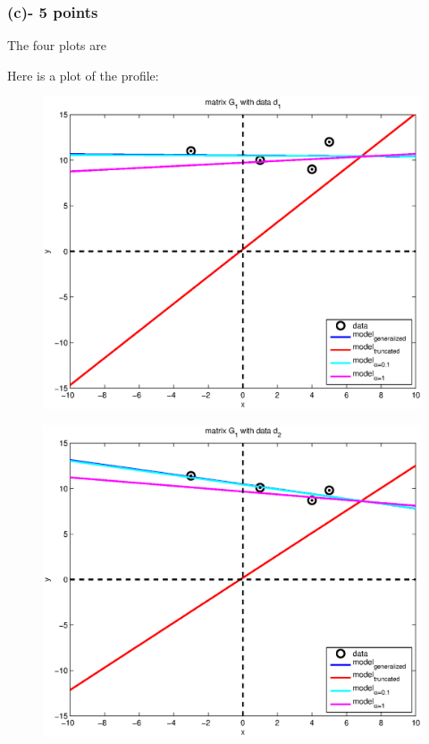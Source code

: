 \documentclass[11pt]{article}
\begin{document}
\subsubsection*{(c)- 5 points}
The four plots are

\noindent Here is a plot of the profile:
\begin{figure}
\begin{center}
  \includegraphics[width=12cm]{p3b1.eps}
  \end{center}
\end{figure}
\begin{figure}
\begin{center}
  \includegraphics[width=12cm]{p3b2.eps}
  \end{center}
\end{figure}
\end{document}
